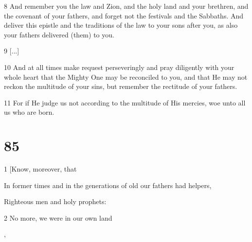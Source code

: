 \par 8 And remember you the law and Zion, and the holy land and your brethren, and the covenant of your fathers, and forget not the festivals and the Sabbaths. And deliver this epistle and the traditions of the law to your sons after you, as also your fathers delivered (them) to you. 

\par 9 [...]

\par 10 And at all times make request perseveringly and pray diligently with your whole heart that the Mighty One may be reconciled to you, and that He may not reckon the multitude of your sins, but remember the rectitude of your fathers.

\par 11 For if He judge us not according to the multitude of His mercies, woe unto all us who are born.

\chapter{85}

\par 1 [Know, moreover, that

\par In former times and in the generations of old our fathers had helpers, 

\par Righteous men and holy prophets:

\par 2 No more, we were in our own land

\par [And they helped us when we sinned],

